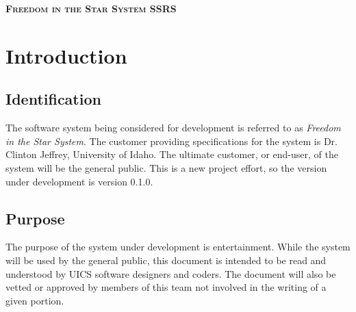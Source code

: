 \documentclass[twoside,letterpaper]{article}
\begin{document}
\clearpage
\begin{minipage}{\linewidth}
\centering
\textsc{
	\textbf{Freedom in the Star System SSRS}}

\vspace{2em}



\end{minipage}

\setcounter{tocdepth}{9}
\renewcommand\contentsname{\centering\textsc{\textbf{Table of Contents}}}
\tableofcontents


\section{Introduction}

\subsection{Identification}

The software system being considered for development is referred to as \textit{Freedom in the Star System}.  The customer providing specifications for the system is Dr. Clinton Jeffrey, University of Idaho.  The ultimate customer, or end-user, of the system will be the general public.  This is a new project effort, so the version under development is version 0.1.0.

\subsection{Purpose}
The purpose of the system under development is entertainment.  While the system will be used by the general public, this document is intended to be read and understood by UICS software
designers and coders. The document will also be vetted or approved by members of this team not involved in the writing of a given portion.
\end{document}
